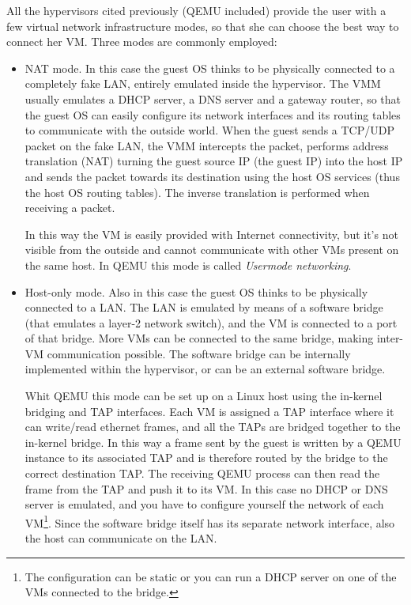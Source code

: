 \vspace{0.5cm}

All the hypervisors cited previously (QEMU included) provide the user with a few virtual network infrastructure modes, 
so that she can choose the best way to connect her VM.
Three modes are commonly employed:
\begin{itemize}
    \item NAT mode. In this case the guest OS thinks to be physically connected to a completely fake LAN, entirely emulated inside the 
	  hypervisor. The VMM usually emulates a DHCP server, a DNS server and a gateway router, so that the guest OS can easily
	  configure its network interfaces and its routing tables
	  to communicate with the outside world. When the guest sends a TCP/UDP packet on the fake LAN, the VMM intercepts the packet,
	  performs address translation (NAT) turning the guest source IP (the guest IP) into the host IP and sends the packet towards
	  its destination using the host OS services (thus the host OS routing tables). The inverse translation is performed when
	  receiving a packet.
	  
	  In this way the VM is easily provided with Internet connectivity, but it's not visible from the outside
	  and cannot communicate with other VMs present on the same host.
	  In QEMU this mode is called \emph{Usermode networking}.

    \item Host-only mode. Also in this case the guest OS thinks to be physically connected to a LAN. The LAN is emulated
	  by means of a software bridge (that emulates a layer-2 network switch), and the VM is connected to a port of that bridge.
	  More VMs can be connected to the same bridge, making inter-VM communication possible. The software bridge can be internally
	  implemented within the hypervisor, or can be an external software bridge.
	  
	  Whit QEMU this mode can be set up on a Linux host using the in-kernel bridging and TAP interfaces. Each VM is assigned a TAP
	  interface where it can write/read ethernet frames, and all the TAPs are bridged together to the in-kernel bridge.
	  In this way a frame sent by the guest is written by a QEMU instance to its associated TAP and is therefore routed by the bridge
	  to the correct destination TAP. The receiving QEMU process can then read the frame from the TAP and push it to its VM.
	  In this case no DHCP or DNS server is emulated, and you have to configure yourself the network of each VM\footnote{The 
	  configuration can be static or you can run a DHCP server on one of the VMs connected to the bridge.}.
	  Since the software bridge itself has its separate network interface, also the host can communicate on the LAN.
	  

\end{itemize}
